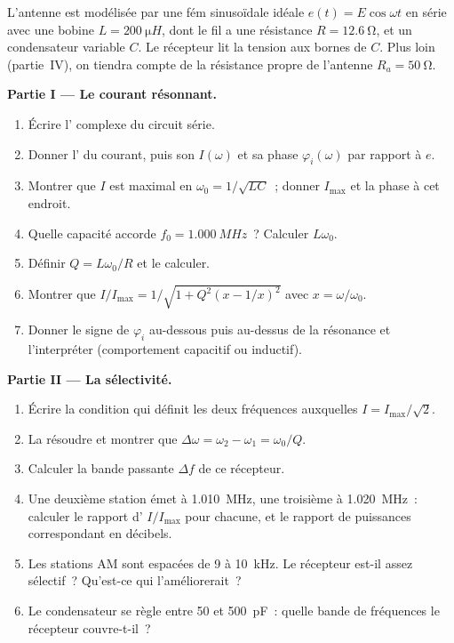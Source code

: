 \begin{problem}
\label{pb:b1:sinusoidal-impedance:1}
L'antenne est modélisée par une fém sinusoïdale idéale
$e(t) = E\cos\omega t$ en série avec une bobine $L = \qty{200}{\micro H}$,
dont le fil a une résistance $R = \qty{12.6}{\ohm}$, et un condensateur
variable $C$. Le récepteur lit la tension aux bornes de $C$. Plus loin
(partie~IV), on tiendra compte de la résistance propre de l'antenne
$R_a = \qty{50}{\ohm}$.

\medskip
\noindent\textbf{Partie I --- Le courant résonnant.}
\begin{enumerate}
  \item Écrire l' complexe du circuit série.
  \item Donner l' du courant, puis son 
        $I(\omega)$ et sa phase $\varphi_i(\omega)$ par rapport à $e$.
  \item Montrer que $I$ est maximal en $\omega_0 = 1/\sqrt{LC}$~; donner
        $I_{\max}$ et la phase à cet endroit.
  \item Quelle capacité accorde $f_0 = \qty{1.000}{MHz}$~? Calculer
        $L\omega_0$.
  \item Définir $Q = L\omega_0/R$ et le calculer.
  \item Montrer que $I/I_{\max} = 1/\sqrt{1 + Q^2(x - 1/x)^2}$ avec
        $x = \omega/\omega_0$.
  \item Donner le signe de $\varphi_i$ au-dessous puis au-dessus de la
        résonance et l'interpréter (comportement capacitif ou inductif).
\end{enumerate}

\medskip
\noindent\textbf{Partie II --- La sélectivité.}
\begin{enumerate}[resume]
  \item Écrire la condition qui définit les deux fréquences auxquelles
        $I = I_{\max}/\sqrt2$.
  \item La résoudre et montrer que $\Delta\omega = \omega_2 - \omega_1 =
        \omega_0/Q$.
  \item Calculer la bande passante $\Delta f$ de ce récepteur.
  \item Une deuxième station émet à \qty{1.010}{MHz}, une troisième à
        \qty{1.020}{MHz}~: calculer le rapport d' $I/I_{\max}$
        pour chacune, et le rapport de puissances correspondant en décibels.
  \item Les stations AM sont espacées de \qty{9}{} à \qty{10}{kHz}. Le
        récepteur est-il assez sélectif~? Qu'est-ce qui l'améliorerait~?
  \item Le condensateur se règle entre \qty{50}{} et \qty{500}{pF}~:
        quelle bande de fréquences le récepteur couvre-t-il~?
\end{enumerate}


\end{problem}
